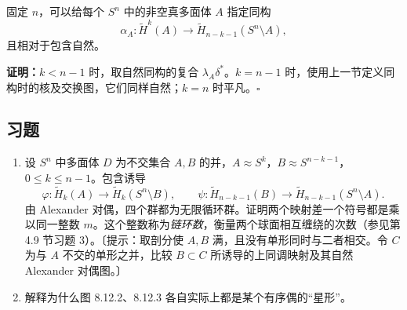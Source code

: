 固定 $n$，可以给每个 $S^n$ 中的非空真多面体 $A$ 指定同构
\[\alpha_A:\widetilde H^k(A)\to\widetilde H_{n-k-1}(S^n\setminus A),\]
且相对于包含自然。

\textbf{证明：}$k<n-1$ 时，取自然同构的复合 $\lambda_A\delta^*$。$k=n-1$ 时，使用上一节定义同构时的核及交换图，它们同样自然；$k=n$ 时平凡。\hfill$\square$

\subsection*{习题}
\begin{enumerate}
\item 设 $S^n$ 中多面体 $D$ 为不交集合 $A,B$ 的并，$A\approx S^k$，$B\approx S^{n-k-1}$，$0\le k\le n-1$。包含诱导
\[\varphi:\widetilde H_k(A)\to\widetilde H_k(S^n\setminus B),\qquad
\psi:\widetilde H_{n-k-1}(B)\to\widetilde H_{n-k-1}(S^n\setminus A).\]
由 Alexander 对偶，四个群都为无限循环群。证明两个映射差一个符号都是乘以同一整数 $m$。这个整数称为\emph{链环数}，衡量两个球面相互缠绕的次数（参见第 4.9 节习题 3）。〔提示：取剖分使 $A,B$ 满，且没有单形同时与二者相交。令 $C$ 为与 $A$ 不交的单形之并，比较 $B\subset C$ 所诱导的上同调映射及其自然 Alexander 对偶图。〕
\item 解释为什么图 8.12.2、8.12.3 各自实际上都是某个有序偶的“星形”。
\end{enumerate}
